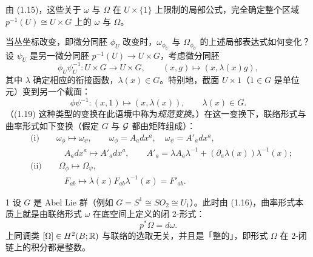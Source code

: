 由 (1.15)，这些关于 $\omega$ 与 $\Omega$ 在 $U\times\{1\}$ 上限制的局部公式，完全确定整个区域 $p^{-1}(U)\cong U\times G$ 上的 $\omega$ 与 $\Omega$。

当丛坐标改变，即微分同胚 $\phi_U$ 改变时，$\omega_{\phi_U}$ 与 $\Omega_{\phi_U}$ 的上述局部表达式如何变化？设 $\psi_U$ 是另一微分同胚 $p^{-1}(U)\to U\times G$，考虑微分同胚
\begin{equation}
\phi_U\psi_U^{-1}:U\times G\to U\times G,\qquad (x,g)\mapsto(x,\lambda(x)g), \tag{1.18}
\end{equation}
其中 $\lambda$ 确定相应的衔接函数，$\lambda(x)\in G$。特别地，截面 $U\times1$（$1\in G$ 是单位元）变到另一个截面：
\begin{equation}
\phi\psi^{-1}:(x,1)\mapsto(x,\lambda(x)),\qquad \lambda(x)\in G. \tag{1.19}
\end{equation}
（(1.19) 这种类型的变换在此语境中称为\emph{规范变换}。）在这一变换下，联络形式与曲率形式如下变换（假定 $G$ 与 $\mathcal{G}$ 都由矩阵组成）：
\begin{equation}
\begin{aligned}
&\text{(i)}\qquad \omega_\phi\mapsto\omega_\psi,\qquad \omega_\phi=A_adx^a,\quad \omega_\psi=A'_adx^a,\\
&\qquad\qquad A_adx^a\mapsto A'_adx^a,\qquad A'_a=\lambda A_a\lambda^{-1}+(\partial_a\lambda(x))\lambda^{-1}(x);\\
&\text{(ii)}\qquad \Omega_\phi\mapsto\Omega_\psi,\\
&\qquad\qquad F_{ab}\mapsto\lambda(x)F_{ab}\lambda^{-1}(x)=F'_{ab}.
\end{aligned}
\tag{1.20}
\end{equation}

\begin{example*}{1}
设 $G$ 是 Abel Lie 群（例如 $G=S^1\cong SO_2\cong U_1$）。此时由 (1.16)，曲率形式本质上就是由联络形式 $\omega$ 在底空间上定义的闭 2-形式：
\[
p^*\Omega=d\omega.
\]
上同调类 $[\Omega]\in H^2(B;\mathbb{R})$ 与联络的选取无关，并且是「整的」，即形式 $\Omega$ 在 2-闭链上的积分都是整数。
\end{example*}

